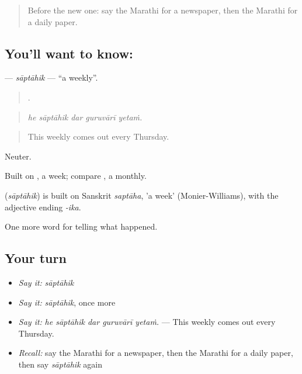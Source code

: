 \label{lesson:MR-C310-saptahik}



\begin{quote}
Before the new one: say the Marathi for a newspaper, then the Marathi for a daily paper.
\end{quote}

\subsection*{You'll want to know: }
\textbf{} — \emph{sāptāhik} — \textquotedblleft{}a weekly\textquotedblright{}.

\begin{quote}
    .
\end{quote}

\begin{quote}
\emph{he sāptāhik dar guruvārī yetaṁ.}
\end{quote}

\begin{quote}
This weekly comes out every Thursday.
\end{quote}

Neuter.

Built on , a week; compare , a monthly.

\begin{cousinweb}
\textbf{} (\emph{sāptāhik}) is built on Sanskrit \emph{saptāha}, 'a week' (Monier-Williams), with the adjective ending \emph{-ika}.
\end{cousinweb}

\begin{grammarlens}[title={What you've built}]
One more word for telling what happened.
\end{grammarlens}

\subsection*{Your turn}
\begin{itemize}
\raggedright
  \item \emph{Say it:} \emph{sāptāhik}
  \item \emph{Say it:} \emph{sāptāhik}, once more
  \item \emph{Say it:} \emph{he sāptāhik dar guruvārī yetaṁ.} — This weekly comes out every Thursday.
  \item \emph{Recall:} say the Marathi for a newspaper, then the Marathi for a daily paper, then say \emph{sāptāhik} again
\end{itemize}

